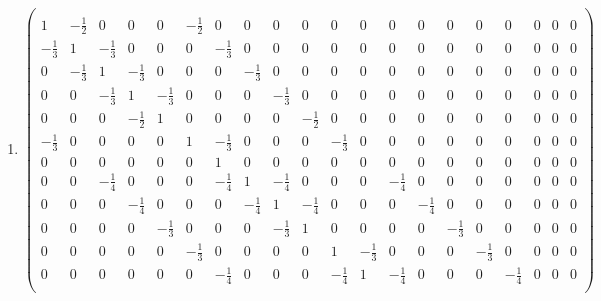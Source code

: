\documentclass[12 pt, letterpaper]{hmcpset}
\begin{document}
\begin{landscape}
\begin{solution}
\begin{enumerate}
		\item \setcounter{MaxMatrixCols}{20}
			\[
				\boxed{
\begin{pmatrix}
 \\
   1 & -\frac{1}{2} &    0 &    0 &    0 & -\frac{1}{2} &    0 &    0 &    0 &    0 &    0 &    0 &    0 &    0 &    0 &    0 &    0 &    0 &    0 &    0 \\
-\frac{1}{3} &    1 & -\frac{1}{3} &    0 &    0 &    0 & -\frac{1}{3} &    0 &    0 &    0 &    0 &    0 &    0 &    0 &    0 &    0 &    0 &    0 &    0 &    0 \\
   0 & -\frac{1}{3} &    1 & -\frac{1}{3} &    0 &    0 &    0 & -\frac{1}{3} &    0 &    0 &    0 &    0 &    0 &    0 &    0 &    0 &    0 &    0 &    0 &    0 \\
   0 &    0 & -\frac{1}{3} &    1 & -\frac{1}{3} &    0 &    0 &    0 & -\frac{1}{3} &    0 &    0 &    0 &    0 &    0 &    0 &    0 &    0 &    0 &    0 &    0 \\
   0 &    0 &    0 & -\frac{1}{2} &    1 &    0 &    0 &    0 &    0 & -\frac{1}{2} &    0 &    0 &    0 &    0 &    0 &    0 &    0 &    0 &    0 &    0  \\
-\frac{1}{3} &    0 &    0 &    0 &    0 &    1 & -\frac{1}{3} &    0 &    0 &    0 & -\frac{1}{3} &    0 &    0 &    0 &    0 &    0 &    0 &    0 &    0 &    0  \\
   0 &    0 &    0 &    0 &    0 &    0 &    1 &    0 &    0 &    0 &    0 &    0 &    0 &    0 &    0 &    0 &    0 &    0 &    0 &    0  \\
   0 &    0 & -\frac{1}{4} &    0 &    0 &    0 & -\frac{1}{4} &    1 & -\frac{1}{4} &    0 &    0 &    0 & -\frac{1}{4} &    0 &    0 &    0 &    0 &    0 &    0 &    0 \\
   0 &    0 &    0 & -\frac{1}{4} &    0 &    0 &    0 & -\frac{1}{4} &    1 & -\frac{1}{4} &    0 &    0 &    0 & -\frac{1}{4} &    0 &    0 &    0 &    0 &    0 &    0  \\
   0 &    0 &    0 &    0 & -\frac{1}{3} &    0 &    0 &    0 & -\frac{1}{3} &    1 &    0 &    0 &    0 &    0 & -\frac{1}{3} &    0 &    0 &    0 &    0 &    0  \\
   0 &    0 &    0 &    0 &    0 & -\frac{1}{3} &    0 &    0 &    0 &    0 &    1 & -\frac{1}{3} &    0 &    0 &    0 & -\frac{1}{3} &    0 &    0 &    0 &    0 \\
   0 &    0 &    0 &    0 &    0 &    0 & -\frac{1}{4} &    0 &    0 &    0 & -\frac{1}{4} &    1 & -\frac{1}{4} &    0 &    0 &    0 & -\frac{1}{4} &    0 &    0 &    0 \\

\end{pmatrix}}\]
\end{enumerate}
\end{solution}
\end{landscape}
\end{document}
